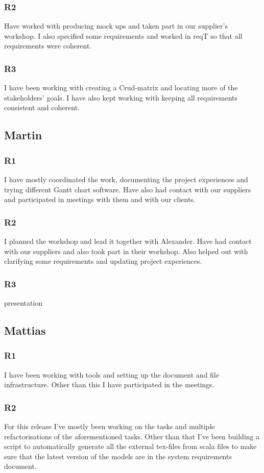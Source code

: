 \documentclass[a4paper]{article}
\begin{document}
		\subsubsection{R2}
		Have worked with producing mock ups and taken part in our supplier's workshop. I also specified some requirements and worked in reqT so that all requirements were coherent.
		\subsubsection{R3}
		I have been working with creating a Crud-matrix and locating more of the stakeholders' goals. I have also kept working with keeping all requirements consistent and coherent.
			
	
	\subsection{Martin}
		\subsubsection{R1}
		I have mostly coordinated the work, documenting the project experiences and trying different Gantt chart software. Have also had contact with our suppliers and participated in meetings with them and with our clients.
		\subsubsection{R2}
		I planned the workshop and lead it together with Alexander. Have had contact with our suppliers and also took part in their workshop. Also helped out with clarifying some requirements and updating project experiences.
		\subsubsection{R3}
			presentation
	
	\subsection{Mattias}
		\subsubsection{R1}
		I have been working with tools and setting up the document and file infrastructure. Other than this I have participated in the meetings.
		\subsubsection{R2}
		For this release I've mostly been working on the tasks and multiple refactorisations of the aforementioned tasks. Other than that I've been building a script to automatically generate all the external tex-files from scala files to make sure that the latest version of the models are in the system requirements document.
\end{document}
